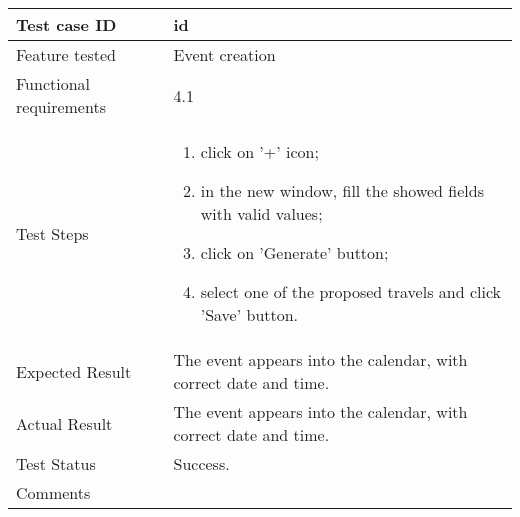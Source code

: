 \begin{table}[H]
	\begin{center}
		\begin{tabular}{ | p{} | p{} | }
		\hline
		Test case ID & id\\
		\hline
		Feature tested & Event creation\\
		\hline
		Functional requirements & 4.1  \\
    	\hline
		Test Steps & 
			\begin{enumerate}
				\item click on '+' icon;
				\item in the new window, fill the showed fields with valid values;
				\item click on 'Generate' button;
				\item select one of the proposed travels and click 'Save' button. 
			\end{enumerate} \\
		\hline
		Expected Result & The event appears into the calendar, with correct date and time.\\
		\hline
		Actual Result & The event appears into the calendar, with correct date and time.\\ 
		\hline
		Test Status & \color{ForestGreen}Success.\\ 
		\hline
		Comments & \\ 
		\hline
		
		\end{tabular}
	\end{center}
\end{table}


